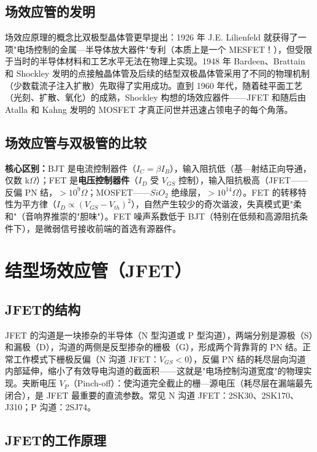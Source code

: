 \documentclass[12pt,UTF8]{ctexbook}
\begin{document}
\subsection{场效应管的发明}

场效应原理的概念比双极型晶体管更早提出：1926 年 J.E. Lilienfeld 就获得了一项"电场控制的金属—半导体放大器件"专利（本质上是一个 MESFET！），但受限于当时的半导体材料和工艺水平无法在物理上实现。1948 年 Bardeen、Brattain 和 Shockley 发明的点接触晶体管及后续的结型双极晶体管采用了不同的物理机制（少数载流子注入扩散）先取得了实用成功。直到 1960 年代，随着硅平面工艺（光刻、扩散、氧化）的成熟，Shockley 构想的场效应器件——JFET 和随后由 Atalla 和 Kahng 发明的 MOSFET 才真正问世并迅速占领电子的每个角落。

\subsection{场效应管与双极管的比较}

\textbf{核心区别：}BJT 是电流控制器件（$I_C=\beta I_B$），输入阻抗低（基—射结正向导通，仅数 k$\Omega$）；FET 是\textbf{电压控制器件}（$I_D$ 受 $V_{GS}$ 控制），输入阻抗极高（JFET——反偏 PN 结，$>10^9\Omega$；MOSFET——$SiO_2$ 绝缘层，$>10^{14}\Omega$）。FET 的转移特性为平方律（$I_D\propto (V_{GS}-V_{th})^2$），自然产生较少的奇次谐波，失真模式更"柔和"（音响界推崇的"胆味"）。FET 噪声系数低于 BJT（特别在低频和高源阻抗条件下），是微弱信号接收前端的首选有源器件。

\section{结型场效应管（JFET）}
\label{sec:jfet}

\subsection{JFET的结构}

JFET 的沟道是一块掺杂的半导体（N 型沟道或 P 型沟道），两端分别是源极（S）和漏极（D），沟道的两侧是反型掺杂的栅极（G），形成两个背靠背的 PN 结。正常工作模式下栅极反偏（N 沟道 JFET：$V_{GS}<0$），反偏 PN 结的耗尽层向沟道内部延伸，缩小了有效导电沟道的截面积——这就是"电场控制沟道宽度"的物理实现。夹断电压 $V_P$（Pinch-off）：使沟道完全截止的栅—源电压（耗尽层在漏端最先闭合），是 JFET 最重要的直流参数。常见 N 沟道 JFET：2SK30、2SK170、J310；P 沟道：2SJ74。

\subsection{JFET的工作原理}
\end{document}

